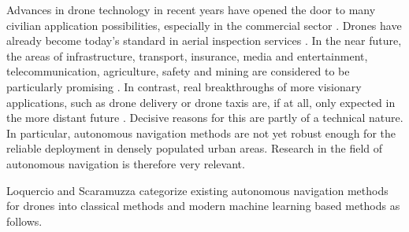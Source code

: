Advances in drone technology in recent years
have opened the door to many civilian application possibilities,
especially in the commercial sector \cite{Dunn}.
Drones have already become today's standard in 
aerial inspection services
\cite{Cohn, Equinox, Abuhasira}.
In the near future, the areas of
infrastructure,
transport,
insurance,
media and entertainment,
telecommunication,
agriculture,
safety
and mining 
are considered to be particularly promising \cite{Mazur2016a}.
In contrast, 
real breakthroughs of more visionary applications, 
such as drone delivery or drone taxis
are, if at all, only expected in the more distant future \cite{Rosen2019}.
Decisive reasons for this are partly of a technical nature.
In particular, autonomous navigation methods are not yet 
robust enough for the reliable deployment in densely populated urban areas. 
\cite{brunner2019urban}
Research in the field of autonomous navigation is therefore very relevant.

Loquercio and Scaramuzza \cite{Loquercio2018a} 
categorize existing autonomous navigation methods for drones 
into classical methods and modern machine learning based methods as follows. 

